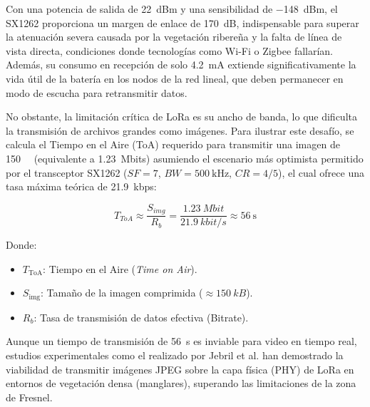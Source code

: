 Con una potencia de salida de \SI{+22}{dBm} y una sensibilidad de \SI{-148}{dBm}, el SX1262 proporciona un margen de enlace de \SI{170}{dB}, indispensable para superar la atenuación severa causada por la vegetación ribereña y la falta de línea de vista directa, condiciones donde tecnologías como Wi-Fi o Zigbee fallarían. Además, su consumo en recepción de solo \SI{4.2}{\milli\ampere} extiende significativamente la vida útil de la batería en los nodos de la red lineal, que deben permanecer en modo de escucha para retransmitir datos.

No obstante, la limitación crítica de LoRa es su ancho de banda, lo que dificulta la transmisión de archivos grandes como imágenes. Para ilustrar este desafío, se calcula el Tiempo en el Aire (ToA) requerido para transmitir una imagen de \SI{150}{\kilo\byte} (equivalente a \SI{1.23}{Mbits}) asumiendo el escenario más optimista permitido por el transceptor SX1262 ($SF=7$, $BW=\SI{500}{\kilo\hertz}$, $CR=4/5$), el cual ofrece una tasa máxima teórica de \SI{21.9}{kbps}:

\begin{equation} \label{eq:calculo_toa_imagen}
T_{ToA} \approx \frac{S_{img}}{R_{b}} = \frac{\SI{1.23}{Mbit}}{\SI{21.9}{kbit/s}} \approx \SI{56}{\second}
\end{equation}

Donde:

\begin{itemize}
    \item $T_{\mathrm{ToA}}$: Tiempo en el Aire (\textit{Time on Air}).
    \item $S_{\mathrm{img}}$: Tamaño de la imagen comprimida ($\approx \SI{150}{kB}$).
    \item $R_{b}$: Tasa de transmisión de datos efectiva (Bitrate).
\end{itemize}

Aunque un tiempo de transmisión de \SI{56}{\second} es inviable para video en tiempo real, estudios experimentales como el realizado por Jebril et al. \cite{jebril2018overcoming} han demostrado la viabilidad de transmitir imágenes JPEG sobre la capa física (PHY) de LoRa en entornos de vegetación densa (manglares), superando las limitaciones de la zona de Fresnel.

